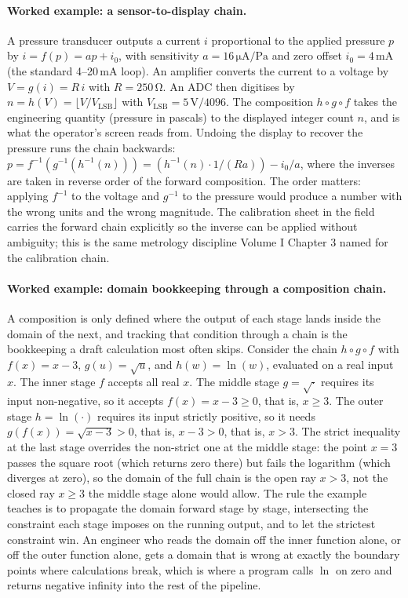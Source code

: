 \paragraph{Worked example: a sensor-to-display chain.}
A pressure transducer outputs a current $i$ proportional to the
applied pressure $p$ by $i = f(p) = a p + i_{0}$, with sensitivity
$a = 16\,\si{\micro\ampere\per\pascal}$ and zero offset
$i_{0} = 4\,\si{\milli\ampere}$ (the standard 4--20\,mA loop). An
amplifier converts the current to a voltage by $V = g(i) = R\,i$
with $R = 250\,\si{\ohm}$. An ADC then digitises by
$n = h(V) = \lfloor V/V_{\text{LSB}} \rfloor$ with
$V_{\text{LSB}} = 5\,\si{\volt}/4096$.
The composition $h \circ g \circ f$ takes the engineering
quantity (pressure in pascals) to the displayed integer count
$n$, and is what the operator's screen reads from. Undoing the
display to recover the pressure runs the chain backwards:
$p = f^{-1}(g^{-1}(h^{-1}(n))) = (h^{-1}(n) \cdot 1/(Ra)) -
i_{0}/a$, where the inverses are taken in reverse order of the
forward composition. The order matters: applying $f^{-1}$ to the
voltage and $g^{-1}$ to the pressure would produce a number with
the wrong units and the wrong magnitude. The calibration sheet in
the field carries the forward chain explicitly so the inverse can
be applied without ambiguity; this is the same metrology
discipline Volume I Chapter 3 named for the calibration chain.

\paragraph{Worked example: domain bookkeeping through a composition
chain.}
A composition is only defined where the output of each stage lands
inside the domain of the next, and tracking that condition through a
chain is the bookkeeping a draft calculation most often skips. Consider
the chain $h \circ g \circ f$ with $f(x) = x - 3$, $g(u) = \sqrt{u}$,
and $h(w) = \ln(w)$, evaluated on a real input $x$. The inner stage
$f$ accepts all real $x$. The middle stage $g = \sqrt{\cdot}$ requires
its input non-negative, so it accepts $f(x) = x - 3 \geq 0$, that is,
$x \geq 3$. The outer stage $h = \ln(\cdot)$ requires its input
strictly positive, so it needs $g(f(x)) = \sqrt{x - 3} > 0$, that is,
$x - 3 > 0$, that is, $x > 3$. The strict inequality at the last stage
overrides the non-strict one at the middle stage: the point $x = 3$
passes the square root (which returns zero there) but fails the
logarithm (which diverges at zero), so the domain of the full chain is
the open ray $x > 3$, not the closed ray $x \geq 3$ the middle stage
alone would allow. The rule the example teaches is to propagate the
domain forward stage by stage, intersecting the constraint each stage
imposes on the running output, and to let the strictest constraint
win. An engineer who reads the domain off the inner function alone, or
off the outer function alone, gets a domain that is wrong at exactly
the boundary points where calculations break, which is where a program
calls $\ln$ on zero and returns negative infinity into the rest of the
pipeline.

